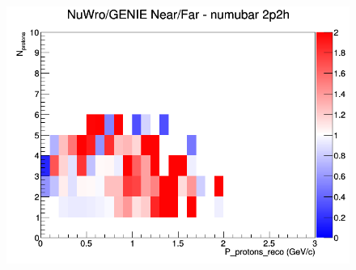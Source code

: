 \begin{figure}[h]
\endminipage
{}
\includegraphics[width=\linewidth]{eff_N_P/LAr/protons/ratios/2p2h_NuWro_GENIE_numubar_NF_N_P.png}
\endminipage
\newline
\end{figure}
\clearpage
